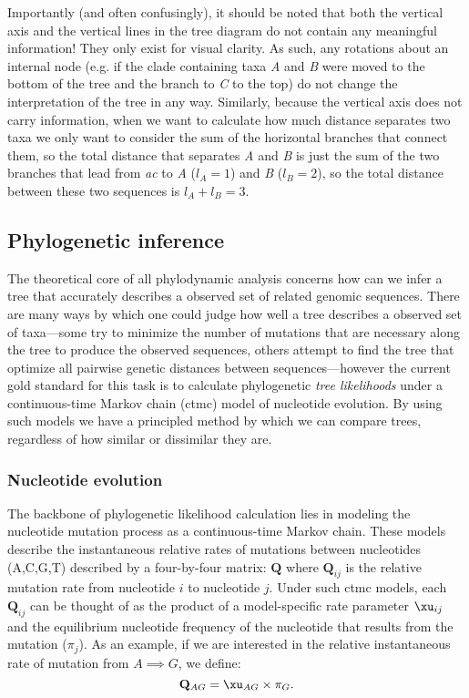 Importantly (and often confusingly), it should be noted that both the vertical axis and the vertical lines in the tree diagram do not contain any meaningful information!
They only exist for visual clarity.
As such, any rotations about an internal node (e.g. if the clade containing taxa \textit{A} and \textit{B} were moved to the bottom of the tree and the branch to \textit{C} to the top) do not change the interpretation of the tree in any way.
Similarly, because the vertical axis does not carry information, when we want to calculate how much distance separates two taxa we only want to consider the sum of the horizontal branches that connect them, so the total distance that separates \textit{A} and \textit{B} is just the sum of the two branches that lead from \textit{ac} to \textit{A} ($l_A=1$) and \textit{B} ($l_B=2$), so the total distance between these two sequences is $l_A + l_B = 3$.

\subsection{Phylogenetic inference}
The theoretical core of all phylodynamic analysis concerns how can we infer a tree that accurately describes a observed set of related genomic sequences.
There are many ways by which one could judge how well a tree describes a observed set of taxa---some try to minimize the number of mutations that are necessary along the tree to produce the observed sequences, others attempt to find the tree that optimize all pairwise genetic distances between sequences---however the current gold standard for this task is to calculate phylogenetic \textit{tree likelihoods} under a continuous-time Markov chain (\gls{ctmc}) model of nucleotide evolution.
By using such models we have a principled method by which we can compare trees, regardless of how similar or dissimilar they are.

\subsubsection{Nucleotide evolution}
The backbone of phylogenetic likelihood calculation lies in modeling the nucleotide mutation process as a continuous-time Markov chain.
These models describe the instantaneous relative rates of mutations between nucleotides (A,C,G,T) described by a four-by-four matrix: $\mathbf{Q}$ where $\mathbf{Q}_{ij}$ is the relative mutation rate from nucleotide $i$ to nucleotide $j$.
Under such \gls{ctmc} models, each $\mathbf{Q}_{ij}$ can be thought of as the product of a model-specific rate parameter $\xu_{ij}$ and the equilibrium nucleotide frequency of the nucleotide that results from the mutation ($\pi_j$).
As an example, if we are interested in the relative instantaneous rate of mutation from $A \implies G$, we define:
\begin{equation}
  \mathbf{Q}_{AG} = \xu_{AG} \times \pi_G.
\end{equation}

